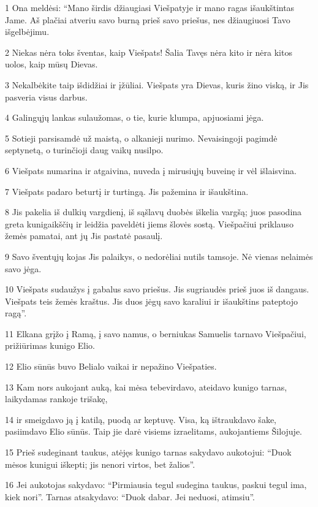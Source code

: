 \par 1 Ona meldėsi: “Mano širdis džiaugiasi Viešpatyje ir mano ragas išaukštintas Jame. Aš plačiai atveriu savo burną prieš savo priešus, nes džiaugiuosi Tavo išgelbėjimu. 
\par 2 Niekas nėra toks šventas, kaip Viešpats! Šalia Tavęs nėra kito ir nėra kitos uolos, kaip mūsų Dievas. 
\par 3 Nekalbėkite taip išdidžiai ir įžūliai. Viešpats yra Dievas, kuris žino viską, ir Jis pasveria visus darbus. 
\par 4 Galingųjų lankas sulaužomas, o tie, kurie klumpa, apjuosiami jėga. 
\par 5 Sotieji parsisamdė už maistą, o alkanieji nurimo. Nevaisingoji pagimdė septynetą, o turinčioji daug vaikų nusilpo. 
\par 6 Viešpats numarina ir atgaivina, nuveda į mirusiųjų buveinę ir vėl išlaisvina. 
\par 7 Viešpats padaro beturtį ir turtingą. Jis pažemina ir išaukština. 
\par 8 Jis pakelia iš dulkių vargdienį, iš sąšlavų duobės iškelia vargšą; juos pasodina greta kunigaikščių ir leidžia paveldėti jiems šlovės sostą. Viešpačiui priklauso žemės pamatai, ant jų Jis pastatė pasaulį. 
\par 9 Savo šventųjų kojas Jis palaikys, o nedorėliai nutils tamsoje. Nė vienas nelaimės savo jėga. 
\par 10 Viešpats sudaužys į gabalus savo priešus. Jis sugriaudės prieš juos iš dangaus. Viešpats teis žemės kraštus. Jis duos jėgų savo karaliui ir išaukštins pateptojo ragą”. 
\par 11 Elkana grįžo į Ramą, į savo namus, o berniukas Samuelis tarnavo Viešpačiui, prižiūrimas kunigo Elio. 
\par 12 Elio sūnūs buvo Belialo vaikai ir nepažino Viešpaties. 
\par 13 Kam nors aukojant auką, kai mėsa tebevirdavo, ateidavo kunigo tarnas, laikydamas rankoje trišakę, 
\par 14 ir smeigdavo ją į katilą, puodą ar keptuvę. Visa, ką ištraukdavo šake, pasiimdavo Elio sūnūs. Taip jie darė visiems izraelitams, aukojantiems Šilojuje. 
\par 15 Prieš sudeginant taukus, atėjęs kunigo tarnas sakydavo aukotojui: “Duok mėsos kunigui iškepti; jis nenori virtos, bet žalios”. 
\par 16 Jei aukotojas sakydavo: “Pirmiausia tegul sudegina taukus, paskui tegul ima, kiek nori”. Tarnas atsakydavo: “Duok dabar. Jei neduosi, atimsiu”. 
